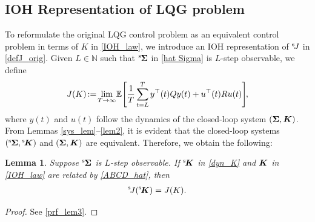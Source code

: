 \documentclass[preprint,5p,times,twocolumn]{elsarticle}
\newcommand{\bm}[1]{{\mbox{\boldmath $#1$}}}
\newtheorem{lem}{Lemma}
\def\rms{{}^{\rm s}\hspace{-0.2mm}}
\def\rmsK{{}^{\rm s}\hspace{-0.4mm}}
\def\rmsJ{{}^{\rm s}\hspace{-0.5mm}}
\def\h{\hspace{-0.5mm}}
\def\H{\hspace{-1.0mm}}
\begin{document}
\subsection{IOH Representation of LQG problem}\label{Sec3C}
To reformulate the original LQG control problem as an equivalent control problem in terms of $K$ in \eqref{IOH_law},
we introduce an IOH representation of $\rmsJ J$ in \eqref{defJ_orig}. Given $L \in \mathbb N$ such that $\rms {\bm \Sigma}$ in \eqref{hat Sigma} is $L$-step observable, we define
\begin{equation}
    \label{cost}
     J(K) \h :=\h \lim_{T \rightarrow \infty}\h {\mathbb E}\h
    \left[\frac{1}{T} 
    \sum_{t=L}^{T}y^{\top}(t)Qy(t) + u^{\top}(t)Ru(t) \right]\H, 
\end{equation}
where $y(t)$ and $u(t)$ follow the dynamics of the closed-loop system $({\bm \Sigma}, {\bm K})$. 
From Lemmas \ref{sys_lem}–\ref{lem2}, it is evident that the closed-loop systems $(\rms {\bm \Sigma}, \rmsK {\bm K})$ and $({\bm \Sigma}, {\bm K})$ are equivalent. Therefore, we obtain the following: 
\begin{lem}\label{prp1}
Suppose $\rms {\bm \Sigma}$ is $L$-step observable. If $\rmsK {\bm K}$ in \eqref{dyn_K} and ${\bm K}$ in \eqref{IOH_law} are related by \eqref{ABCD_hat}, then
\begin{align}\label{equi_cost}
    \rmsJ J(\rmsK {\bm K}) = J(K). 
\end{align}
\end{lem}
\begin{proof}
See \ref{prf_lem3}. 
\end{proof}
\end{document}
